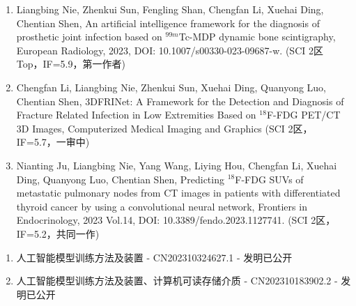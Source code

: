 \begin{publications}
    \begin{enumerate}
        \item Liangbing Nie, Zhenkui Sun, Fengling Shan, Chengfan Li, Xuehai Ding, Chentian Shen, An artificial intelligence framework for the diagnosis of prosthetic joint infection based on \(^{99m}\)Tc-MDP dynamic bone scintigraphy, European Radiology, 2023, DOI: 10.1007/s00330-023-09687-w. (SCI 2区 Top，IF=5.9，第一作者)
        \item Chengfan Li, Liangbing Nie, Zhenkui Sun, Xuehai Ding, Quanyong Luo, Chentian Shen, 3DFRINet: A Framework for the Detection and Diagnosis of Fracture Related Infection in Low Extremities Based on \(^{18}\)F-FDG PET/CT 3D Images, Computerized Medical Imaging and Graphics (SCI 2区，IF=5.7，一审中)
        \item Nianting Ju, Liangbing Nie, Yang Wang, Liying Hou, Chengfan Li, Xuehai Ding, Quanyong Luo, Chentian Shen, Predicting \(^{18}\)F-FDG SUVs of metastatic pulmonary nodes from CT images in patients with differentiated thyroid cancer by using a convolutional neural network, Frontiers in Endocrinology, 2023 Vol.14, DOI: 10.3389/fendo.2023.1127741. (SCI 2区，IF=5.2，共同一作)
    \end{enumerate}

    \begin{enumerate}
        \item 人工智能模型训练方法及装置 - CN202310324627.1 - 发明已公开
        \item 人工智能模型训练方法及装置、计算机可读存储介质 - CN202310183902.2 - 发明已公开
    \end{enumerate}
\end{publications}
